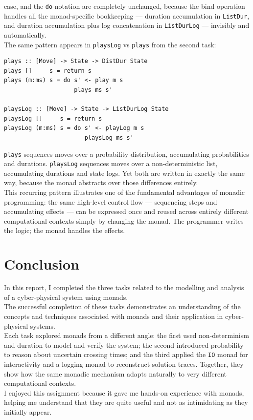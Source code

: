 \documentclass[a4paper,12pt]{report}
\begin{document}
case, and the \texttt{do} notation are completely unchanged, because the bind
operation handles all the monad-specific bookkeeping — duration accumulation in
\texttt{ListDur}, and duration accumulation plus log concatenation in
\texttt{ListDurLog} — invisibly and automatically.
\\[1em]
The same pattern appears in \texttt{playsLog} vs \texttt{plays} from the second task:
\begin{verbatim}
plays :: [Move] -> State -> DistDur State
plays []     s = return s
plays (m:ms) s = do s' <- play m s
                    plays ms s'
 
playsLog :: [Move] -> State -> ListDurLog State
playsLog []     s = return s
playsLog (m:ms) s = do s' <- playLog m s
                       playsLog ms s'
\end{verbatim}
\texttt{plays} sequences moves over a probability distribution, accumulating
probabilities and durations. \texttt{playsLog} sequences moves over a non-deterministic
list, accumulating durations and state logs. Yet both are written in exactly the same
way, because the monad abstracts over those differences entirely.
\\[1em]
This recurring pattern illustrates one of the fundamental advantages of monadic
programming: the same high-level control flow — sequencing steps and accumulating effects — can be expressed once and reused across entirely different
computational contexts simply by changing the monad. The programmer writes the logic;
the monad handles the effects.
\chapter{Conclusion}
In this report, I completed the three tasks related to the modelling and analysis of a cyber-physical system using monads.\\

The successful completion of these tasks demonstrates an understanding of the concepts and techniques associated with monads and their application in cyber-physical systems.\\

Each task explored monads from a different angle: the first used non-determinism and duration to model and verify the system; the second introduced probability to reason about uncertain crossing times; and the third applied the \texttt{IO} monad for interactivity and a logging monad to reconstruct solution traces. Together, they show how the same monadic mechanism adapts naturally to very different computational contexts.\\

I enjoyed this assignment because it gave me hands-on experience with monads, helping me understand that they are quite useful and not as intimidating as they initially appear.
\end{document}
